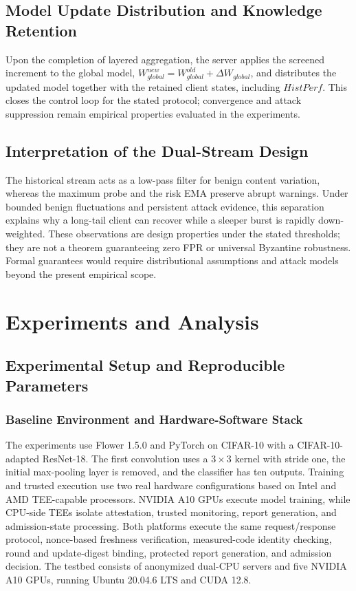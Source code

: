 \documentclass[11pt, a4paper]{article}
\begin{document}
\subsection{Model Update Distribution and Knowledge Retention}
Upon the completion of layered aggregation, the server applies the screened increment to the global model, $W_{global}^{new}=W_{global}^{old}+\Delta W_{global}$, and distributes the updated model together with the retained client states, including $HistPerf$. This closes the control loop for the stated protocol; convergence and attack suppression remain empirical properties evaluated in the experiments.

\subsection{Interpretation of the Dual-Stream Design}
The historical stream acts as a low-pass filter for benign content variation,
whereas the maximum probe and the risk EMA preserve abrupt warnings. Under
bounded benign fluctuations and persistent attack evidence, this separation
explains why a long-tail client can recover while a sleeper burst is rapidly
down-weighted. These observations are design properties under the stated
thresholds; they are not a theorem guaranteeing zero FPR or universal Byzantine
robustness. Formal guarantees would require distributional assumptions and
attack models beyond the present empirical scope.

\section{Experiments and Analysis}
\label{sec:experiments}
\subsection{Experimental Setup and Reproducible Parameters}

\subsubsection{Baseline Environment and Hardware-Software Stack}
The experiments use Flower 1.5.0 and PyTorch on CIFAR-10 with a
CIFAR-10-adapted ResNet-18. The first convolution uses a $3\times3$ kernel
with stride one, the initial max-pooling layer is removed, and the classifier
has ten outputs. Training and trusted execution use two real hardware
configurations based on Intel and AMD TEE-capable processors. NVIDIA A10 GPUs
execute model training, while CPU-side TEEs isolate attestation, trusted
monitoring, report generation, and admission-state processing. Both platforms
execute the same request/response protocol, nonce-based freshness verification,
measured-code identity checking, round and update-digest binding, protected
report generation, and admission decision. The testbed consists of anonymized
dual-CPU servers and five NVIDIA A10 GPUs, running Ubuntu 20.04.6 LTS and CUDA
12.8.
\end{document}
